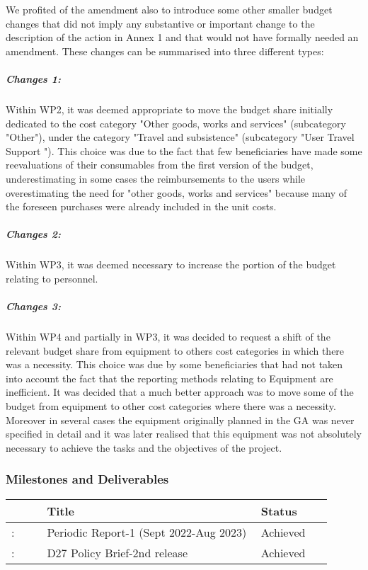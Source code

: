 We profited of the amendment also to introduce some other smaller budget changes that did not imply any substantive or important change to the description of the action in Annex 1 and that would not have formally needed an amendment. These changes can be summarised into three different types:
\subparagraph{Changes 1:} Within WP2, it was deemed appropriate to move the budget share initially dedicated to the cost category "Other goods, works and services" (subcategory "Other"), under the category "Travel and subsistence" (subcategory "User Travel Support ").
This choice was due to the fact that few beneficiaries have made some reevaluations of their consumables from the first version of the budget, underestimating in some cases the reimbursements to the users while overestimating the need for "other goods, works and services" because many of the foreseen purchases were already included in the unit costs.
\subparagraph{Changes 2:} Within WP3, it was deemed necessary to increase the portion of the budget relating to personnel.
\subparagraph{Changes 3:} Within WP4 and partially in WP3, it was decided to request a shift of the relevant budget share from equipment to others cost categories in which there was a necessity. 
This choice was due by some beneficiaries that had not taken into account the fact that the reporting methods relating to Equipment are inefficient. It was decided that a much better approach was to move some of the budget from equipment to other cost categories where there was a necessity.
Moreover in several cases the equipment originally planned in the GA was never specified in detail and it was later realised that this equipment was not absolutely necessary to achieve the tasks and the objectives of the project.


\subsubsection*{Milestones and Deliverables}

{\fontsize{9}{11}\selectfont
\begin{center}
  \begin{tabular}[t]{!{\color{mygray}\vrule}p{0.10\linewidth}!
  {\color{mygray}\vrule}p{0.60\linewidth}!
  {\color{mygray}\vrule}p{0.20\linewidth}!{\color{mygray}\vrule} } \hline
     & {\bf Title} & {\bf Status} \\ \hline
    : & Periodic Report-1 (Sept 2022-Aug 2023) &  Achieved\\ \hline
   : & D27 Policy Brief-2nd release &  Achieved\\ \hline 
  \end{tabular}
\end{center}
}

